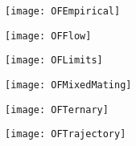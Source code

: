 \documentclass[letterpaper,titlepage]{scrartcl}
\begin{document}

\newpage

\begin{figure}[p]
  \texttt{[image: OFEmpirical]}
  \caption{}
  \label{fig:empirical}
\end{figure}

\begin{figure}[p]
  \texttt{[image: OFFlow]}
  \caption{}
  \label{fig:fates}
\end{figure}

\begin{figure}[p]
  \texttt{[image: OFLimits]}
  \caption{}
  \label{fig:limits}
\end{figure}

\begin{figure}[p]
  \texttt{[image: OFMixedMating]}
  \caption{}
  \label{fig:mixedMating}
\end{figure}

\begin{figure}[p]
  \texttt{[image: OFTernary]}
  \caption{}
  \label{fig:ternary}
\end{figure}

\begin{figure}[p]
  \texttt{[image: OFTrajectory]}
  \caption{}
  \label{fig:trajectory}
\end{figure}
\end{document}
